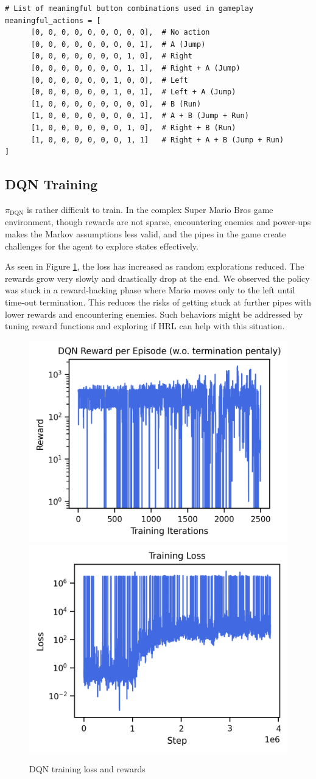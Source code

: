 \documentclass{article}
\begin{document}
\begin{verbatim}
# List of meaningful button combinations used in gameplay
meaningful_actions = [
      [0, 0, 0, 0, 0, 0, 0, 0, 0],  # No action
      [0, 0, 0, 0, 0, 0, 0, 0, 1],  # A (Jump)
      [0, 0, 0, 0, 0, 0, 0, 1, 0],  # Right
      [0, 0, 0, 0, 0, 0, 0, 1, 1],  # Right + A (Jump)
      [0, 0, 0, 0, 0, 0, 1, 0, 0],  # Left
      [0, 0, 0, 0, 0, 0, 1, 0, 1],  # Left + A (Jump)
      [1, 0, 0, 0, 0, 0, 0, 0, 0],  # B (Run)
      [1, 0, 0, 0, 0, 0, 0, 0, 1],  # A + B (Jump + Run)
      [1, 0, 0, 0, 0, 0, 0, 1, 0],  # Right + B (Run)
      [1, 0, 0, 0, 0, 0, 0, 1, 1]   # Right + A + B (Jump + Run)
]
\end{verbatim}

\subsection{DQN Training}
\label{a2:dqn}

$\pi_{\text{DQN}}$ is rather difficult to train. In the 
complex Super Mario Bros game environment, though rewards are not sparse, encountering enemies 
and power-ups makes the Markov assumptions less valid, and the pipes in the 
game create challenges for the agent to explore states effectively.

As seen in Figure \ref{figa:dqn}, the loss has increased as random explorations 
reduced. The rewards grow very slowly and drastically drop at the end. We 
observed the policy was stuck in a reward-hacking phase where Mario moves only 
to the left until time-out termination. This reduces the risks of getting stuck 
at further pipes with lower rewards and encountering enemies. Such behaviors 
might be addressed by tuning reward functions and exploring if HRL can help 
with this situation.

\begin{figure}[htbp]
\centering
\includegraphics[width=0.45\columnwidth]{figures/dqn_rewards.png}
\hspace{0.5cm} %
\includegraphics[width=0.45\columnwidth]{figures/dqn_loss.png}
\caption{DQN training loss and rewards}
\label{figa:dqn}
\end{figure}
\end{document}
